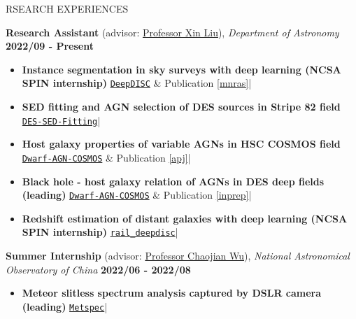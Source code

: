 \documentclass[11pt]{article} %
\begin{document}
\begin{section}{RSEARCH EXPERIENCES}

\textbf{Research Assistant} (advisor: \href{mailto:xinliuxl@illinois.edu}{Professor Xin Liu}), \textit{Department of Astronomy} \hfill \textbf{2022/09 - Present} 
\begin{itemize}[leftmargin=1.5em]
    \item \label{project1} \textbf{Instance segmentation in sky surveys with deep learning (NCSA SPIN internship)} 
    \hfill {\footnotesize \href{https://github.com/burke86/deepdisc}{\texttt{DeepDISC}} \& Publication \ref{mnras}}| %
    \item \textbf{SED fitting and AGN selection of DES sources in Stripe 82 field} 
    \hfill {\footnotesize \href{https://github.com/Chisen-Lupus/DES-SED-fitting}{\texttt{DES-SED-Fitting}}}| %
    \item \textbf{Host galaxy properties of variable AGNs in HSC COSMOS field} 
    \hfill {\footnotesize \href{https://github.com/burke86/dwarf_agn_cosmos}{\texttt{Dwarf-AGN-COSMOS}} \& Publication \ref{apj}}| %
    \item \textbf{Black hole - host galaxy relation of AGNs in DES deep fields (leading)} 
    \hfill {\footnotesize \href{https://github.com/burke86/dwarf_agn_cosmos}{\texttt{Dwarf-AGN-COSMOS}} \& Publication \ref{inprep}}| %
    \item \textbf{Redshift estimation of distant galaxies with deep learning (NCSA SPIN internship)} 
    \hfill {\footnotesize \href{https://github.com/LSSTDESC/rail_deepdisc}{\texttt{rail\_deepdisc}}}| %
\end{itemize}

\textbf{Summer Internship} (advisor: \href{mailto:chjwu@bao.ac.cn}{Professor Chaojian Wu}), \textit{National Astronomical Observatory of China} \hfill \textbf{2022/06 - 2022/08} 
\begin{itemize}[leftmargin=1.5em]
    \item \textbf{Meteor slitless spectrum analysis captured by DSLR camera (leading)} 
    \hfill {\footnotesize \href{https://github.com/Chisen-Lupus/metspec}{\texttt{Metspec}}}| %
\end{itemize}


\end{section}
\end{document}
